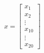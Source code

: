 \documentclass[preview]{standalone}
\begin{document}
\begin{align*}
x = \begin{bmatrix} x_1 \\ x_2 \\ \vdots \\ x_{10} \\ \vdots \\ x_{20} \end{bmatrix}
\end{align*}
\end{document}

